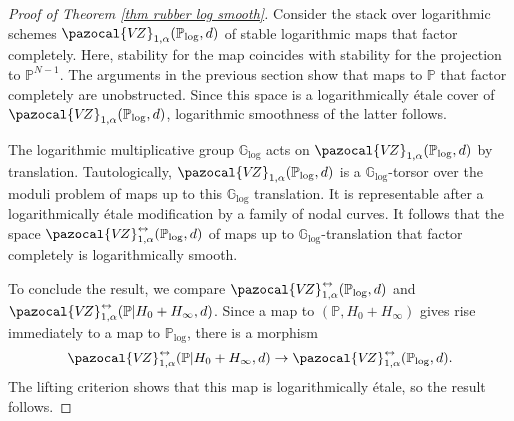 \documentclass[11pt]{amsart}
\newcommand{\VZ}{\pazocal{V\!Z}}
\renewcommand{\to}{\rightarrow}
\newcommand{\Glog}{\mathbb{G}_{\mathrm{log}}}
\theoremstyle{definition}
\theoremstyle{definition}
\begin{document}
\begin{comment}
The bundle $\mathbb P\to \mathbb P^{N-1}$ gives rise to a $\mathbb G_{\operatorname{m}}$-torsor by deleting the zero and infinity sections. Replacing these fibres by their $\mathbb G_{\mathrm{log}}$ compactifications, we obtain a non-representable functor on logarithmic schemes $\mathbb P_{\mathrm{log}}$ and a logarithmically \'etale modification
\[
\mathbb P\to \mathbb P_{\mathrm{log}}.
\]
\end{comment}

\begin{proof}[Proof of Theorem \ref{thm rubber log smooth}]
Consider the stack over logarithmic schemes $\VZ_{1,\alpha}(\mathbb P_{\mathrm{log}},d)$ of stable logarithmic maps that factor completely. Here, stability for the map coincides with stability for the projection to $\mathbb P^{N-1}$. The arguments in the previous section show that maps to $\mathbb P$ that factor completely are unobstructed. Since this space is a logarithmically \'etale cover of $\VZ_{1,\alpha}(\mathbb P_{\mathrm{log}},d)$, logarithmic smoothness of the latter follows.

The logarithmic multiplicative group $\mathbb G_{\mathrm{log}}$ acts on $\VZ_{1,\alpha}(\mathbb P_{\mathrm{log}},d)$ by translation. Tautologically, $\VZ_{1,\alpha}(\mathbb P_{\mathrm{log}},d)$ is a $\mathbb G_{\mathrm{log}}$-torsor over the moduli problem of maps up to this $\mathbb G_{\mathrm{log}}$ translation. It is representable after a logarithmically \'etale modification by a family of nodal curves. It follows that the space $\VZ^{\leftrightarrow}_{1,\alpha}(\mathbb P_{\mathrm{log}},d)$ of maps up to $\Glog$-translation that factor completely is logarithmically smooth. 

To conclude the result, we compare $\VZ^{\leftrightarrow}_{1,\alpha}(\mathbb P_{\mathrm{log}},d)$ and  $\VZ^{\leftrightarrow}_{1,\alpha}(\mathbb P|H_0+H_\infty,d)$. Since a map to $(\mathbb P,H_0+H_\infty)$ gives rise immediately to a map to $\mathbb P_{\mathrm{log}}$, there is a morphism
\[
\VZ^{\leftrightarrow}_{1,\alpha}(\mathbb P|H_0+H_\infty,d)\to \VZ^{\leftrightarrow}_{1,\alpha}(\mathbb P_{\mathrm{log}},d).
\]
The lifting criterion shows that this map is logarithmically \'etale, so the result follows.
\end{proof}
\end{document}
